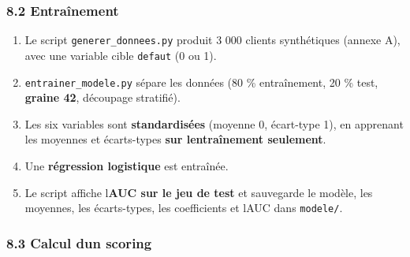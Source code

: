 \documentclass[
  french,
  11pt,
  a4paper,
]{article}
\providecommand{\tightlist}{%
  \setlength{\itemsep}{0pt}\setlength{\parskip}{0pt}}
\begin{document}
\subsubsection{8.2 Entraînement}\label{82-entrauxeenement}

\begin{enumerate}
\def\labelenumi{\arabic{enumi}.}
\tightlist
\item
  Le script \texttt{generer\_\allowbreak{}donnees.\allowbreak{}py}
  produit 3 000 clients synthétiques (annexe A), avec une variable cible
  \texttt{defaut} (0 ou 1).
\item
  \texttt{entrainer\_\allowbreak{}modele.\allowbreak{}py} sépare les
  données (80 \% entraînement, 20 \% test, \textbf{graine 42}, découpage
  stratifié).
\item
  Les six variables sont \textbf{standardisées} (moyenne 0, écart-type
  1), en apprenant les moyennes et écarts-types \textbf{sur
  l\textquotesingle entraînement seulement}.
\item
  Une \textbf{régression logistique} est entraînée.
\item
  Le script affiche l\textquotesingle{}\textbf{AUC sur le jeu de test}
  et sauvegarde le modèle, les moyennes, les écarts-types, les
  coefficients et l\textquotesingle AUC dans \texttt{modele/}.
\end{enumerate}

\subsubsection{8.3 Calcul d\textquotesingle un
scoring}\label{83-calcul-dun-scoring}
\end{document}
